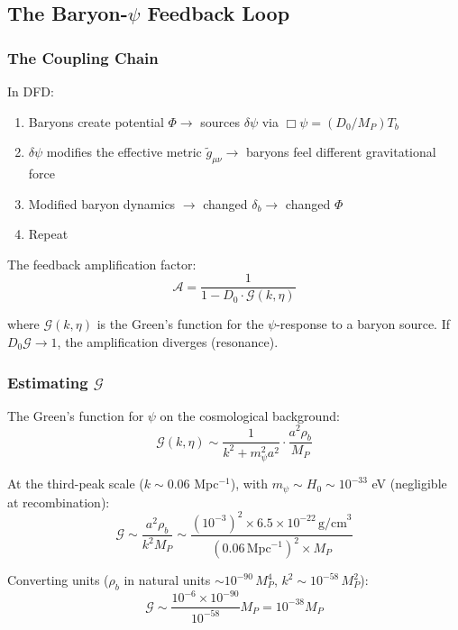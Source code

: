 \documentclass[11pt,a4paper]{article}
\begin{document}
\subsection{The Baryon-$\psi$ Feedback Loop}

\subsubsection{The Coupling Chain}

In DFD:
\begin{enumerate}
\item Baryons create potential $\Phi \to$ sources $\delta\psi$ via $\Box\psi = (D_0/M_P)T_b$
\item $\delta\psi$ modifies the effective metric $\tilde{g}_{\mu\nu} \to$ baryons feel different gravitational force
\item Modified baryon dynamics $\to$ changed $\delta_b \to$ changed $\Phi$
\item Repeat
\end{enumerate}

The feedback amplification factor:
\begin{equation}
\mathcal{A} = \frac{1}{1 - D_0\cdot\mathcal{G}(k,\eta)}
\end{equation}

where $\mathcal{G}(k,\eta)$ is the Green's function for the $\psi$-response to a baryon source. If $D_0\mathcal{G} \to 1$, the amplification diverges (resonance).

\subsubsection{Estimating $\mathcal{G}$}

The Green's function for $\psi$ on the cosmological background:
\begin{equation}
\mathcal{G}(k,\eta) \sim \frac{1}{k^2 + m_\psi^2 a^2}\cdot\frac{a^2\rho_b}{M_P}
\end{equation}

At the third-peak scale ($k \sim 0.06$ Mpc$^{-1}$), with $m_\psi \sim H_0 \sim 10^{-33}$ eV (negligible at recombination):
\begin{equation}
\mathcal{G} \sim \frac{a^2\rho_b}{k^2 M_P} \sim \frac{(10^{-3})^2 \times 6.5\times10^{-22}\,\text{g/cm}^3}{(0.06\,\text{Mpc}^{-1})^2 \times M_P}
\end{equation}

Converting units ($\rho_b$ in natural units $\sim 10^{-90}\,M_P^4$, $k^2 \sim 10^{-58}\,M_P^2$):
\begin{equation}
\mathcal{G} \sim \frac{10^{-6}\times10^{-90}}{10^{-58}} M_P = 10^{-38} M_P
\end{equation}
\end{document}
